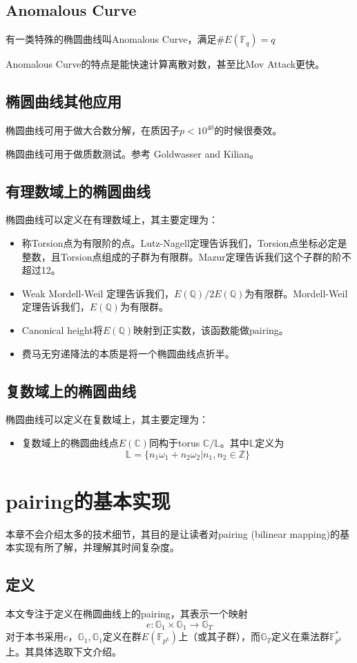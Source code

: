 \documentclass[12pt]{article}
\newcommand{\ec}{椭圆曲线}
\newcommand{\fpk}{\mathbb{F}_{p^k}}
\newcommand{\fq}{\mathbb{F}_q}
\begin{document}
\subsection{Anomalous Curve}
有一类特殊的\ec 叫Anomalous Curve，满足$\# E(\fq) = q$

Anomalous Curve的特点是能快速计算离散对数，甚至比Mov Attack更快。
\subsection{\ec 其他应用}
\ec 可用于做大合数分解，在质因子$p<10^{40}$的时候很奏效。

\ec 可用于做质数测试。参考 Goldwasser and Kilian。
\subsection{有理数域上的\ec}
\ec 可以定义在有理数域上，其主要定理为：
\begin{itemize}
	\item 称Torsion点为有限阶的点。Lutz-Nagell定理告诉我们，Torsion点坐标必定是整数，且Torsion点组成的子群为有限群。Mazur定理告诉我们这个子群的阶不超过12。
	\item Weak Mordell-Weil 定理告诉我们，$E(\mathbb{Q})/2E(\mathbb{Q}) $为有限群。Mordell-Weil 定理告诉我们，$E(\mathbb{Q})$为有限群。
	\item Canonical height将$E(\mathbb{Q})$映射到正实数，该函数能做pairing。
	\item 费马无穷递降法的本质是将一个\ec 点折半。
\end{itemize}
\subsection{复数域上的\ec}
\ec 可以定义在复数域上，其主要定理为：
\begin{itemize}
	\item 复数域上的\ec 点$E(\mathbb{C})$同构于torus $\mathbb{C}/\mathbb{L}$。其中$\mathbb{L}$定义为
	$$\mathbb{L}= \{n_1\omega_1+n_2\omega_2|n_1,n_2 \in \mathbb{Z}\}$$
\end{itemize}

\section{pairing的基本实现}
本章不会介绍太多的技术细节，其目的是让读者对pairing (bilinear mapping)的基本实现有所了解，并理解其时间复杂度。

\subsection{定义}
本文专注于定义在\ec 上的pairing，其表示一个映射
$$e: \mathbb{G}_1 \times \mathbb{G}_1 \rightarrow \mathbb{G}_T$$
对于本书采用$e$，$\mathbb{G}_1, \mathbb{G}_1$定义在群$E(\fpk)$上（或其子群），而$ \mathbb{G}_T$定义在乘法群$\fpk^*$上。其具体选取下文介绍。
\end{document}
